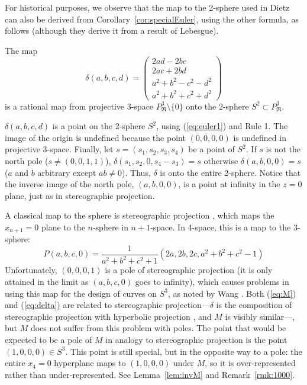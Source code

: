 For historical purposes, we observe that the map to the 2-sphere
used in Dietz \cite{dietz93} can also be derived from 
Corollary~\ref{cor:specialEuler}, using the other formula, as follows
(although they derive it from a result of Lebesgue).

\begin{lemma}
\label{lem:delta}
The map 
\begin{equation}
\label{eq:delta}
\delta(a,b,c,d) = \left( \begin{array}{c}
		2ad - 2bc \\
		2ac + 2bd \\
		a^2 + b^2 - c^2 - d^2 \\
		a^2 + b^2 + c^2 + d^2
		\end{array} \right)
\end{equation}
is a rational map from projective 3-space $P^3_{\Re} \setminus \{0\}$
onto the 2-sphere $S^2 \subset P^3_{\Re}$.
\end{lemma}
\prf
$\delta(a,b,c,d)$ is a point on the 2-sphere $S^2$,
using (\ref{eq:euler1}) and Rule 1.
The image of the origin is undefined because 
the point $(0,0,0,0)$ is undefined in projective 3-space.
Finally, let $s = (s_1,s_2,s_3,s_4)$ be a point of $S^2$.
If $s$ is not the north pole ($s \neq (0,0,1,1)$),
$\delta(s_1,s_2,0,s_4-s_3)=s$
otherwise $\delta(a,b,0,0)=s$ ($a$ and $b$ arbitrary except $ab \neq 0$).
Thus, $\delta$ is onto the entire 2-sphere.
Notice that the inverse image of the north pole, $(a,b,0,0)$, 
is a point at infinity in the $z=0$ plane, just as in stereographic projection.
\QED

A classical map to the sphere is stereographic projection \cite{levinson70},
which maps the $x_{n+1} = 0$ plane to the $n$-sphere in $n+1$-space.
In 4-space, this is a map to the 3-sphere:
%
\begin{equation}
\label{eq:stereo}
	P(a,b,c,0) = \frac{1}{a^2+b^2+c^2+1}(2a,2b,2c,a^2+b^2+c^2-1)
\end{equation}
%
Unfortunately, $(0,0,0,1)$ is a pole of stereographic projection (it is only attained in the limit as $(a,b,c,0)$
goes to infinity), which causes problems in using this map for the design of
curves on $S^3$, as noted by Wang \cite{wang95}.
Both (\ref{eq:M}) and (\ref{eq:delta}) are related to stereographic 
projection---$\delta$ is the composition of stereographic projection with 
hyperbolic projection \cite{dietz93}, and $M$ is visibly similar---,
but $M$ does not suffer from this problem with poles.
The point that would be expected to be a pole of $M$ in analogy to stereographic
projection is the point $(1,0,0,0) \in S^3$.
This point is still special, but in the opposite way to a pole:
the entire $x_4=0$ hyperplane maps to $(1,0,0,0)$ under $M$, so it is 
over-represented rather than under-represented.
See Lemma~\ref{lem:invM} and Remark~\ref{rmk:1000}.


